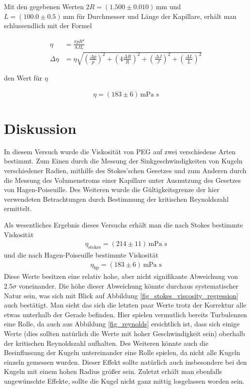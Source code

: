 \documentclass[12pt,a4paper,german]{scrartcl}
\numberwithin{equation}{section}
\begin{document}
  Mit den gegebenen Werten $2R = (1.500 \pm 0.010) \, \text{mm}$ und $L = (100.0 \pm 0.5) \, \text{mm}$ für Durchmesser und Länge der Kapillare, erhält man schlussendlich mit der Formel

  \begin{align}
    \eta &= \frac{\pi p R^4}{8 J L} \nonumber \\
    \Delta \eta &= \eta \sqrt{\left(\frac{\Delta p}{p} \right)^2 + \left(4 \frac{\Delta R}{R} \right)^2 + \left(\frac{\Delta J}{J} \right)^2 + \left(\frac{\Delta L}{L} \right)^2}
  \end{align}

  den Wert für $\eta$

  \begin{align}
    \eta = (183 \pm 6) \, \text{mPa s}
  \end{align}

  \newpage
  \section{Diskussion}
  In diesem Versuch wurde die Viskosität von PEG auf zwei verschiedene Arten bestimmt.
  Zum Einen durch die Messung der Sinkgeschwindigkeiten von Kugeln verschiedener Radien, mithilfe des Stokes'schen Gesetzes und zum Anderen durch die Messung des Volumenstroms einer Kapillare unter Ausnutzung des Gesetzes von Hagen-Poiseuille.
  Des Weiteren wurde die Gültigkeitsgrenze der hier verwendeten Betrachtungen durch Bestimmung der kritischen Reynoldszahl ermittelt.

  Als wesentliches Ergebnis dieses Versuchs erhält man die nach Stokes bestimmte Viskosität
  \begin{align}
    \eta_\text{stokes} = (214 \pm 11) \, \text{mPa s}
  \end{align}
  und die nach Hagen-Poiseuille bestimmte Viskosität
  \begin{align}
    \eta_\text{hp} = (183 \pm 6) \, \text{mPa s}
  \end{align}
  Diese Werte besitzen eine relativ hohe, aber nicht signifikante Abweichung von $2.5\sigma$ voneinander.
  Die höhe dieser Abweichung könnte durchaus systematischer Natur sein, was sich mit Blick auf Abbildung \ref{fig_stokes_viscosity_regression} auch bestätigt.
  Man sieht das sich die letzten paar Werte trotz der Korrektur alle etwas unterhalb der Gerade befinden.
  Hier spielen vermutlich bereits Turbulenzen eine Rolle, da auch aus Abbildung \ref{fig_reynolds} ersichtlich ist, dass sich einige Werte (dies sollten natürlich die Werte mit hoher Geschwindigkeit sein) oberhalb der kritischen Reynoldszahl aufhalten.
  Des Weiteren könnte auch die Beeinflussung der Kugeln untereinander eine Rolle spielen, da nicht alle Kugeln einzeln gemessen wurden.
  Dieser Effekt sollte natürlich auch insbesondere bei den Kugeln mit einem hohen Radius größer sein.
  Zuletzt erhält man ebenfalls ungewünschte Effekte, sollte die Kugel nicht ganz mittig losgelassen worden sein.
\end{document}
